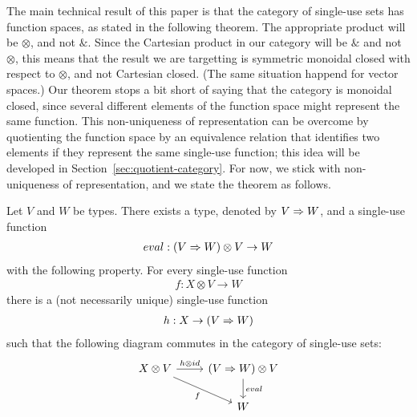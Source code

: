 


 
The main technical result of this paper is that the category of single-use sets has function spaces, as stated in the following theorem.  The appropriate product will be $\otimes$, and not $\&$. Since the Cartesian product in our category will be $\&$ and not $\otimes$, this means that the result we are targetting is symmetric monoidal closed with respect to $\otimes$, and not Cartesian closed. (The same situation happend for vector spaces.)  Our theorem stops a bit short of saying that the category is monoidal closed, since several different elements of the function space might represent the same function. This non-uniqueness of representation can be overcome  by quotienting the function space  by an equivalence relation that identifies two elements if they represent the same single-use function; this idea will be developed  in Section~\ref{sec:quotient-category}. For now, we stick with non-uniqueness of representation, and we state the theorem as follows.

\begin{theorem}\label{thm:single-use-closed}
    Let $V$ and $W$ be types. There exists a type, denoted by  $V \Rightarrow W$, and a single-use function 
    \begin{align*}
    eval : (V \Rightarrow W) \otimes V \to  W
    \end{align*}
    with the following property. For every single-use function
    \begin{align*}
    f : {X \otimes V} \to  W
    \end{align*}
    there is a (not necessarily unique) single-use function 
    \begin{align*}
    h :  X \to (V \Rightarrow W)
    \end{align*}
    such that the following diagram commutes in the category of single-use sets:
    \[
    \begin{tikzcd}
    X \otimes V 
    \arrow[r,"h \otimes id"]
    \arrow[dr,"f"']
    &
    (\funspace V W) \otimes V
    \arrow[d,"eval"] \\
    &
    W
    \end{tikzcd}
    \]
\end{theorem}

